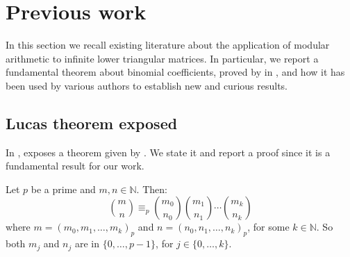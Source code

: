 
\section{Previous work}

In this section we recall existing literature about the application of modular
arithmetic to infinite lower triangular matrices. In particular, we report a
fundamental theorem about binomial coefficients, proved by
\citeauthor{lucas:theorie:des:nombres} in \cite{lucas:theorie:des:nombres}, and
how it has been used by various authors to establish new and curious results.

\subsection{Lucas theorem exposed}

In \cite{fine:1947}, \citeauthor{fine:1947} exposes a theorem given by
\citeauthor{lucas:theorie:des:nombres}. We state it and report a proof since
it is a fundamental result for our work. 
\begin{theorem}
    Let $p$ be a prime and $m,n\in\mathbb{N}$. Then:
    \begin{displaymath}
        {{m}\choose{n}} \equiv_{p} 
            {{m_{0}}\choose{n_{0}}} 
            {{m_{1}}\choose{n_{1}}} 
            \cdots 
            {{m_{k}}\choose{n_{k}}} 
    \end{displaymath}
    where $m=\left(m_{0},m_{1},\ldots,m_{k}\right)_{p}$ and
    $n=\left(n_{0},n_{1},\ldots,n_{k}\right)_{p}$, for some $k\in\mathbb{N}$.
    So both $m_{j}$ and $n_{j}$ are in $\lbrace 0,\ldots, p-1 \rbrace$, for
    $j\in\lbrace 0,\ldots,k\rbrace$.
    \label{thm:lucas:theorem}
\end{theorem}


